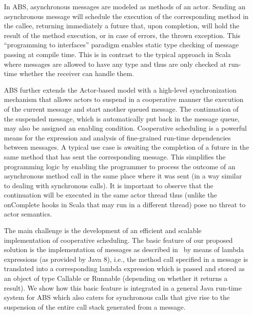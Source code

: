 \par In ABS, asynchronous messages are modeled as methods of an actor.
Sending an asynchronous message will schedule the execution of the corresponding method in the callee, returning immediately a future that, upon completion, will hold the result of the method execution, or in case of errors, the thrown exception.
This ``programming to interfaces'' paradigm enables static type checking of message passing at compile time.
This is in contrast to the typical approach in Scala where messages are allowed to have any type and thus are only checked at run-time whether the receiver can handle them.

ABS further extends the Actor-based model with a high-level synchronization mechanism that allows actors to suspend in a cooperative manner the execution of the current message and start another queued message. 
The continuation of the suspended message, which is automatically put back in the message queue, may also be assigned an enabling condition. Cooperative scheduling is a powerful means for the expression and analysis of fine-grained run-time dependencies between messages.
A typical use case is awaiting the completion of a future in the same method that has sent the corresponding message.
This simplifies the programming logic by enabling the programmer to process the outcome of an asynchronous method call in the same place where it was sent (in a way similar to dealing with synchronous calls).
It is important to observe that the continuation will be executed in the same actor thread thus (unlike the {\ttfamily onComplete} hooks in Scala that may run in a different thread) pose no threat to actor semantics.

The main challenge is the development of an efficient and scalable implementation of cooperative scheduling. 
The basic feature of our proposed solution is the implementation of messages as described in~\cite{paj8} by means of lambda expressions (as provided by Java 8), i.e., the method call specified in a message
is translated into a corresponding lambda expression which is passed and stored as
an object of type Callable or Runnable (depending on whether it returns a result). We show how this basic feature is integrated in a general Java run-time system for ABS which also caters for synchronous calls that give rise to the suspension of the entire call stack generated from a message.

